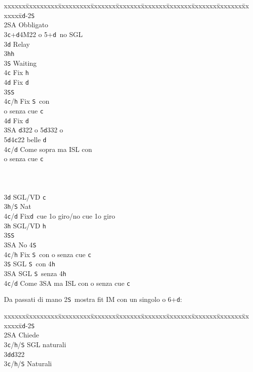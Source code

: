 \documentclass[a4paper,italian]{article}
\newcommand{\BS}{\small{\texttt{S}}}
\newcommand{\BC}{\small{\texttt{c}}}
\newcommand{\BD}{\small{\texttt{d}}}
\newcommand{\BH}{\small{\texttt{h}}}
\newenvironment{bidtable}
{\begin{tabbing}

    xxxxxx\=xxxxxxxxx\=xxxxxxxxx\=xxxxxxx\=xxxxxxx\=xxxxxxx\=xxxxxxx\=xxxxxxx\=xxxxxxx\=xxxxxxx\=\kill}
{\end{tabbing} }%
\begin{document}
\begin{multicols}{2}

    \begin{bidtable}
        1\BD-2\BS\+\\
        2\small{SA} \> Obbligato\+\\
        3\BC {}+\BD 4M22 o 5+\BD\ no SGL\+\\
        3\BD \> Relay\+\\
        3\BH {}\BH \+\\
        3\BS \> Waiting\\
        4\BC \> Fix \BH \\
        4\BD \> Fix \BD \-\\
        3\BS {}\BS \+\\
        4\BC/\BH \> Fix \BS\ con \+\\
        o senza cue \BC \-\\
        4\BD \> Fix \BD \-\\
        3\small{SA} \BD322 o 5\BD 332 o\+\\ 5\BD 4\BC 22 belle \BD\-\\
        4\BC/\BD \> Come sopra ma ISL con\+\\o senza cue \BC\-\-\-\\
        \\
        \\
        \\
        3\BD \> SGL/VD \BC \+\\
        3\BH/\BS \> Nat\\
        4\BC/\BD \> Fix\BD\ cue 1o giro/no cue 1o giro\-\\
        3\BH \> SGL/VD \BH \+\\
        3\BS {}\BS \+\\
        3\small{SA} \> No 4\BS \\
        4\BC/\BH \> Fix \BS\ con o senza cue \BC \-\-\\
        3\BS \> SGL \BS\ con 4\BH \\
        3\small{SA} \> SGL \BS\ senza 4\BH \\
        4\BC/\BD \> Come 3\small{SA} ma ISL con o senza cue \BC \\
    \end{bidtable}
    Da passati di mano 2\BS\ mostra fit IM con un singolo o 6+\BD:
    \begin{bidtable}
        1\BD-2\BS\+\\
        2\small{SA} \> Chiede\+\\
        3\BC/\BH/\BS \> SGL naturali\\
        3\BD {}\BD322\-\\
        3\BC/\BH/\BS \> Naturali\-\\
    \end{bidtable}
\end{multicols}
\end{document}
